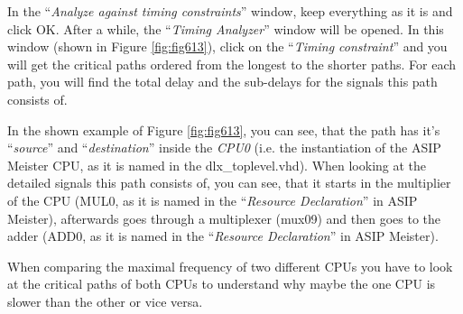 In the ``\emph{Analyze against timing constraints}'' window, keep
everything as it is and click OK. After a while, the ``\emph{Timing
Analyzer}'' window will be opened. In this window (shown in
Figure \ref{fig:fig613}), click on the ``\emph{Timing
constraint}'' and you will get the critical paths ordered from the
longest to the shorter paths. For each path, you will find the total
delay and the sub-delays for the signals this path consists of.

In the shown example of Figure \ref{fig:fig613}, you can
see, that the path has it's ``\emph{source}'' and ``\emph{destination}''
inside the \emph{CPU0} (i.e. the instantiation of the ASIP Meister CPU,
as it is named in the dlx\_toplevel.vhd). When looking at the detailed
signals this path consists of, you can see, that it starts in the
multiplier of the CPU (MUL0, as it is named in the ``\emph{Resource
Declaration}'' in ASIP Meister), afterwards goes through a multiplexer
(mux09) and then goes to the adder (ADD0, as it is named in the
``\emph{Resource Declaration}'' in ASIP Meister).

When comparing the maximal frequency of two different CPUs you have to
look at the critical paths of both CPUs to understand why maybe the one
CPU is slower than the other or vice versa.
